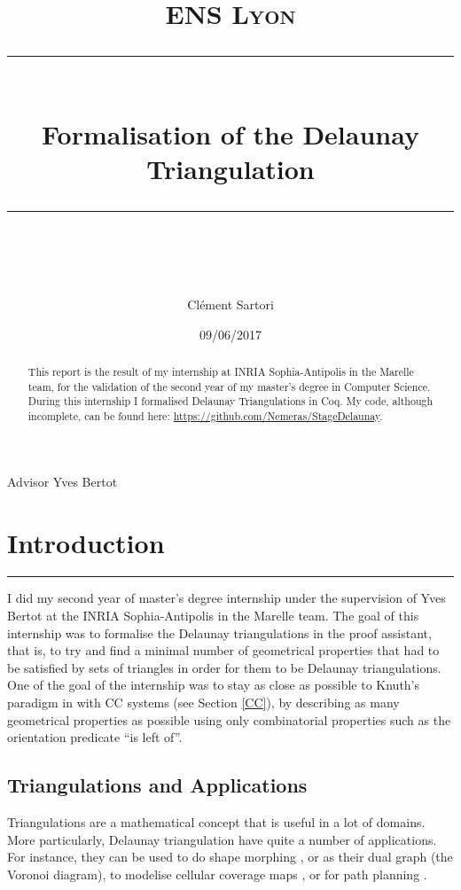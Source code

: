 \documentclass[a4paper,10pt]{article}
\title{
\normalfont \normalsize 
\textsc{ENS Lyon} \\
[10pt] 
\rule{\linewidth}{0.5pt} \\[6pt] 
\huge Formalisation of the Delaunay Triangulation \\
\rule{\linewidth}{2pt}  \\[10pt]
}
\author{Clément Sartori}
\date{\normalsize 09/06/2017}
\begin{document}
\maketitle
\noindent
Advisor \dotfill Yves Bertot \\


\maketitle

\begin{abstract}
  This report is the result of my internship at INRIA Sophia-Antipolis in the Marelle team, for the validation of the second year of my master's degree in Computer Science. During this internship I formalised Delaunay Triangulations in Coq. My code, although incomplete, can be found here: \href{https://github.com/Nemeras/StageDelaunay}{https://github.com/Nemeras/StageDelaunay}.
\end{abstract}

\tableofcontents{}

\newpage

\section{Introduction}
\rule{\linewidth}{0.5pt}

I did my second year of master's degree internship under the supervision of Yves Bertot at the INRIA Sophia-Antipolis in the Marelle team. 
The goal of this internship was to formalise the Delaunay triangulations in the {} proof assistant, that is, to try and find a minimal number of geometrical properties that had to be satisfied by sets of triangles in order for them to be Delaunay triangulations. One of the goal of the internship was to stay as close as possible to Knuth's paradigm in \cite{Knuth92} with CC systems (see Section \ref{CC}), by describing as many geometrical properties as possible using only combinatorial properties such as the orientation predicate ``is left of''.

\subsection{Triangulations and Applications}
Triangulations are a mathematical concept that is useful in a lot of domains. More particularly, Delaunay triangulation have quite a number of applications. For instance, they can be used to do shape morphing \cite{morphing}, or as their dual graph (the Voronoi diagram),  to modelise cellular coverage maps \cite{CelCov}, or for path planning \cite{PathPla}.
\end{document}
